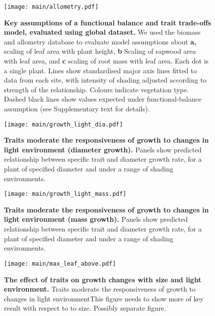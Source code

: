\documentclass[a4paper,11pt]{article}
\begin{document}
\newpage

\begin{figure}[ht]
\centering
\texttt{[image: main/allometry.pdf]}
\caption{\textbf{Key assumptions of a functional balance and trait
trade-offs model, evaluated using global dataset.} We used the biomass and
allometry database to evaluate model assumptions about \textbf{a,}
scaling of leaf area with plant height, \textbf{b} Scaling of sapwood
area with leaf area, and \textbf{c} scaling of root mass with leaf area.
Each dot is a single plant. Lines show standardised major axis lines
fitted to data from each site, with intensity of shading adjusted
according to strength of the relationship. Colours indicate vegetation
type. Dashed black lines show values expected under functional-balance
assumption (see Supplementary text for details). \label{fig:assumptions}}
\end{figure}

\newpage

\begin{figure}[ht]
\centering
\texttt{[image: main/growth\_light\_dia.pdf]}
\caption{\textbf{Traits moderate the responsiveness of growth to changes
in light environment (diameter growth).} Panels show predicted relationship between
specific trait and diameter growth rate, for a plant of specified
diameter and under a range of shading environments.
\label{fig:growth_light_dia}}
\end{figure}

\begin{figure}[ht]
\centering
\texttt{[image: main/growth\_light\_mass.pdf]}
\caption{\textbf{Traits moderate the responsiveness of growth to changes
in light environment (mass growth).} Panels show predicted relationship between
specific trait and diameter growth rate, for a plant of specified
diameter and under a range of shading environments.
\label{fig:growth_light_mass}}
\end{figure}

\newpage

\begin{figure}[ht]
\centering
\texttt{[image: main/max\_leaf\_above.pdf]}
\caption{\textbf{The effect of traits on growth changes with size and
light environment.} Traits moderate the responsiveness of growth to changes in light
environmentThis figure needs to show more of key result with respect to to size.
Possibly separate figure. \label{fig:shifts}}
\end{figure}

\newpage
\end{document}

